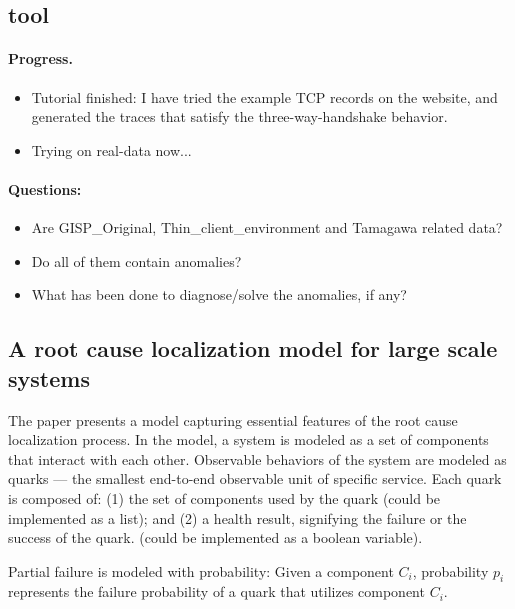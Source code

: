 \documentclass{article}
\begin{document}
\subsection{\saf tool}
\label{sec:saftool}

\paragraph{Progress.}

\begin{itemize}
\item Tutorial finished: I have tried the example TCP records on the \saf
  website, and generated the traces that satisfy the three-way-handshake
  behavior.
\item Trying \saf on real-data now...
\end{itemize}

\paragraph{Questions:}

\begin{itemize}
\item Are GISP\_Original, Thin\_client\_environment and Tamagawa related data? 
\item Do all of them contain anomalies? 
\item What has been done to diagnose/solve the anomalies, if any?

\end{itemize}

\subsection{A root cause localization model for large scale systems}
\label{sec:rootcause}

The paper presents a model capturing essential features of the root cause
localization process. In the model, a system is modeled as a set of components
that interact with each other. Observable behaviors of the system are modeled as
quarks --- the smallest end-to-end observable unit of specific service. Each
quark is composed of:
(1) the set of components used by the quark (could be implemented as a list); and
(2) a health result, signifying the failure or the success of the quark. (could
be implemented as a boolean variable).

Partial failure is modeled with probability: Given a component $C_i$,
probability $p_i$ represents the failure probability of a quark that utilizes
component $C_i$.
\end{document}

